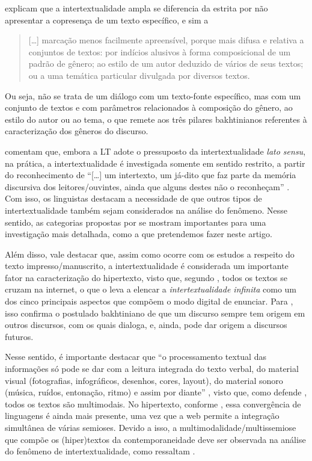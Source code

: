 \documentclass{textolivre}
\begin{document}
\textcite[p. 12]{cavalcante_sobre_2017} explicam que a intertextualidade ampla se diferencia da estrita por não apresentar a copresença de um texto específico, e sim a 

\begin{quote}
    […] marcação menos facilmente apreensível, porque mais difusa e relativa a conjuntos de textos: por indícios alusivos à forma composicional de um padrão de gênero; ao estilo de um autor deduzido de vários de seus textos; ou a uma temática particular divulgada por diversos textos. 
\end{quote}

Ou seja, não se trata de um diálogo com um texto-fonte específico, mas com um conjunto de textos e com parâmetros relacionados à composição do gênero, ao estilo do autor ou ao tema, o que remete aos três pilares bakhtinianos referentes à caracterização dos gêneros do discurso.

\textcite{araujo_consideracoes_2009} comentam que, embora a LT adote o pressuposto da intertextualidade \textit{lato sensu}, na prática, a intertextualidade é investigada somente em sentido restrito, a partir do reconhecimento de “[…] um intertexto, um já-dito que faz parte da memória discursiva dos leitores/ouvintes, ainda que alguns destes não o reconheçam” \cite[p. 569]{araujo_consideracoes_2009}. Com isso, os linguistas destacam a necessidade de que outros tipos de intertextualidade também sejam considerados na análise do fenômeno. Nesse sentido, as categorias propostas por \textcite{koch_intertextualidade:_2012} se mostram importantes para uma investigação mais detalhada, como a que pretendemos fazer neste artigo.

Além disso, vale destacar que, assim como ocorre com os estudos a respeito do texto impresso/manuscrito, a intertextualidade é considerada um importante fator na caracterização do hipertexto, visto que, segundo \textcite{xavier_desafio_2015}, todos os textos se cruzam na internet, o que o leva a elencar a \textit{intertextualidade infinita} como um dos cinco principais aspectos que compõem o modo digital de enunciar. Para \textcite{araujo_consideracoes_2009}, isso confirma o postulado bakhtiniano de que um discurso sempre tem origem em outros discursos, com os quais dialoga, e, ainda, pode dar origem a discursos futuros.

Nesse sentido, é importante destacar que “o processamento textual das informações só pode se dar com a leitura integrada do texto verbal, do material visual (fotografias, infográficos, desenhos, cores, layout), do material sonoro (música, ruídos, entonação, ritmo) e assim por diante” \cite[p. 178]{mozdzenski_intertextualidade_2013}, visto que, como defende \textcite{garcia_intertextualidade_2020}, todos os textos são multimodais. No hipertexto, conforme \textcite{xavier_desafio_2015}, essa convergência de linguagens é ainda mais presente, uma vez que a web permite a integração simultânea de várias semioses. Devido a isso, a multimodalidade/multissemiose que compõe os (hiper)textos da contemporaneidade deve ser observada na análise do fenômeno de intertextualidade, como ressaltam \textcite{mozdzenski_intertextualidade_2013, cavalcante_sobre_2017, garcia_intertextualidade_2020}. 
\end{document}
